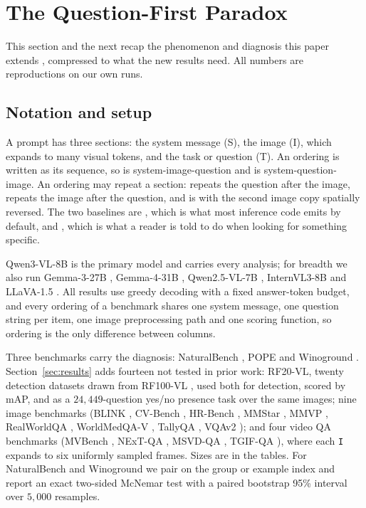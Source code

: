 \section{The Question-First Paradox}
\label{sec:paradox}

This section and the next recap the phenomenon and diagnosis this paper extends
\citep{anon-workshop}, compressed to what the new results need. All numbers are
reproductions on our own runs.

\subsection{Notation and setup}
\label{sec:setup}

A prompt has three sections: the system message (S), the image (I), which
expands to many visual tokens, and the task or question (T). An ordering is
written as its sequence, so \sit{} is system-image-question and \sti{} is
system-question-image. An ordering may repeat a section: \stit{} repeats the
question after the image, \sitit{} repeats the image after the question, and
\sititrev{} is \sitit{} with the second image copy spatially reversed. The two
baselines are \sit{}, which is what most inference code emits by default, and
\sti{}, which is what a reader is told to do when looking for something
specific.

Qwen3-VL-8B \citep{qwen3vl} is the primary model and carries every analysis; for
breadth we also run Gemma-3-27B \citep{gemma3}, Gemma-4-31B \citep{gemma4},
Qwen2.5-VL-7B \citep{qwen25vl}, InternVL3-8B \citep{internvl3} and LLaVA-1.5
\citep{llava15}. All results use greedy decoding with a fixed answer-token
budget, and every ordering of a benchmark shares one system message, one question
string per item, one image preprocessing path and one scoring function, so
ordering is the only difference between columns.

Three benchmarks carry the diagnosis: NaturalBench \citep{naturalbench2024},
POPE \citep{pope2023} and Winoground \citep{winoground2022}.
Section~\ref{sec:results} adds fourteen not tested in prior work: RF20-VL,
twenty detection datasets drawn from RF100-VL \citep{rf100vl2025}, used both for
detection, scored by mAP, and as a $24{,}449$-question yes/no presence task over
the same images; nine image benchmarks (BLINK \citep{blink2024},
CV-Bench \citep{cambrian2024}, HR-Bench \citep{hrbench2025}, MMStar
\citep{mmstar2024}, MMVP \citep{mmvp2024}, RealWorldQA
\citep{realworldqa2024}, WorldMedQA-V \citep{worldmedqav2024}, TallyQA
\citep{tallyqa2019}, VQAv2 \citep{vqav2}); and four video QA benchmarks
(MVBench \citep{mvbench2024}, NExT-QA \citep{nextqa2021}, MSVD-QA
\citep{msvdqa2017}, TGIF-QA \citep{tgifqa2017}), where each \texttt{I} expands
to six uniformly sampled frames. Sizes are in the tables. For NaturalBench and
Winoground we pair on the group or example index and report an exact two-sided
McNemar test with a paired bootstrap 95\% interval over $5{,}000$ resamples.

